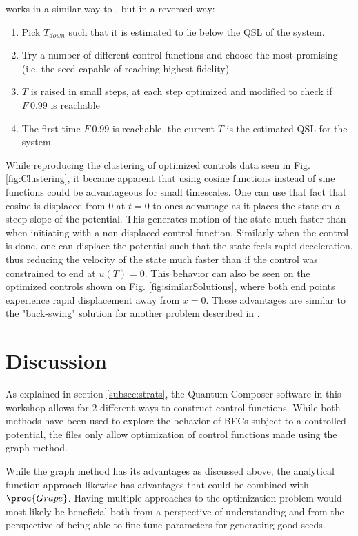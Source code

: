 \documentclass[aps,pra,reprint,superscriptaddress]{revtex4-1}
\begin{document}
 works in a similar way to , but in a reversed way:
\begin{enumerate}
	\item Pick $T_{down}$ such that it is estimated to lie below the QSL of the system.
	\item Try a number of different control functions and choose the most promising (i.e. the seed capable of reaching highest fidelity)
	\item $T$ is raised in small steps, at each step optimized and modified to check if $F~0.99$ is reachable
	\item The first time $F~0.99$ is reachable, the current $T$ is the estimated QSL for the system.
\end{enumerate}

While reproducing the clustering of optimized controls data seen in Fig. \ref{fig:Clustering}, it became apparent that using cosine functions instead of sine functions could be advantageous for small timescales. One can use that fact that cosine is displaced from 0 at $t=0$ to ones advantage as it places the state on a steep slope of the potential. This generates motion of the state much faster than when initiating with a non-displaced control function. Similarly when the control is done, one can displace the potential such that the state feels rapid deceleration, thus reducing the velocity of the state much faster than if the control was constrained to end at $u(T)=0$. This behavior can also be seen on the optimized controls shown on Fig. \ref{fig:similarSolutions}, where both end points experience rapid displacement away from $x=0$. These advantages are similar to the "back-swing" solution for another problem described in \cite{QM2Paper}.
\section{\label{sec:disc}Discussion}
As explained in section \ref{subsec:strats}, the Quantum Composer software in this workshop allows for 2 different ways to construct control functions. While both methods have been used to explore the behavior of BECs subject to a controlled potential, the files only allow optimization of control functions made using the graph method.

While the graph method has its advantages as discussed above, the analytical function approach likewise has advantages that could be combined with $\proc{Grape}$. Having multiple approaches to the optimization problem would most likely be beneficial both from a perspective of understanding and from the perspective of being able to fine tune parameters for generating good seeds.\\
\end{document}
